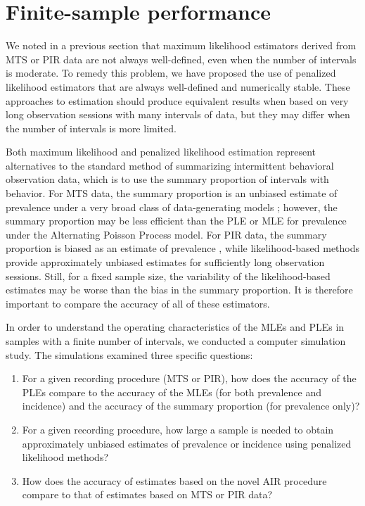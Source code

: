 \documentclass[man, noextraspace, floatsintext]{apa6}\usepackage[]{graphicx}\usepackage[]{color}
\begin{document}
\section{Finite-sample performance}

We noted in a previous section that maximum likelihood estimators derived from MTS or PIR data are not always well-defined, even when the number of intervals is moderate. 
To remedy this problem, we have proposed the use of penalized likelihood estimators that are always well-defined and numerically stable. 
These approaches to estimation should produce equivalent results when based on very long observation sessions with many intervals of data, but they may differ when the number of intervals is more limited. 

Both maximum likelihood and penalized likelihood estimation represent alternatives to the standard method of summarizing intermittent behavioral observation data, which is to use the summary proportion of intervals with behavior. 
For MTS data, the summary proportion is an unbiased estimate of prevalence under a very broad class of data-generating models \citep{Rogosa1991statistical}; however, the summary proportion may be less efficient than the PLE or MLE for prevalence under the Alternating Poisson Process model. 
For PIR data, the summary proportion is biased as an estimate of prevalence \citep{Rogosa1991statistical}, while likelihood-based methods provide approximately unbiased estimates for sufficiently long observation sessions. 
Still, for a fixed sample size, the variability of the likelihood-based estimates may be worse than the bias in the summary proportion. It is therefore important to compare the accuracy of all of these estimators.

In order to understand the operating characteristics of the MLEs and PLEs in samples with a finite number of intervals, we conducted a computer simulation study. The simulations examined three specific questions: 
\begin{enumerate}
\item For a given recording procedure (MTS or PIR), how does the accuracy of the PLEs compare to the accuracy of the MLEs (for both prevalence and incidence) and the accuracy of the summary proportion (for prevalence only)? 
\item For a given recording procedure, how large a sample is needed to obtain approximately unbiased estimates of prevalence or incidence using penalized likelihood methods? 
\item How does the accuracy of estimates based on the novel AIR procedure compare to that of estimates based on MTS or PIR data? 
\end{enumerate}
\end{document}
